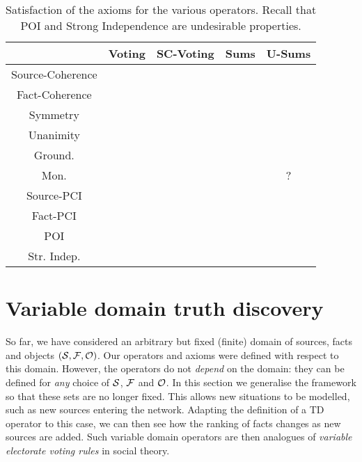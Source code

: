 \begin{table}
\newcommand{\yes}{\checkmark}
\newcommand{\no}{\sffamily{X}}
\newcommand{\notsure}{?}
\centering
    \caption{Satisfaction of the axioms for the various operators. Recall that
    POI and Strong Independence are undesirable properties.}
    \begin{tabular}{| c | c | c | c | c |}
        \hline
                         & Voting & SC-Voting  & Sums & U-Sums   \\
        \hline
        Source-Coherence & \no    & \yes       & \yes & \yes     \\
        Fact-Coherence   & \yes   & \no        & \yes & \yes     \\
        Symmetry         & \yes   & \yes       & \yes & \yes     \\
        Unanimity        & \yes   & \yes       & \yes & \yes     \\
        Ground.          & \yes   & \yes       & \yes & \yes     \\
        Mon.             & \yes   & \yes       & \no  & \notsure \\
        Source-PCI       & \yes   & \no        & \no  & \yes     \\
        Fact-PCI         & \yes   & \yes       & \no  & \yes     \\
        \hline
        POI              & \yes   & \yes       & \no  & \no      \\
        Str. Indep.      & \yes   & \yes       & \no  & \no      \\
        \hline
    \end{tabular}
\label{tab:axioms}
\end{table}

\section{Variable domain truth discovery}
\label{td_sec_variable_domain}

So far, we have considered an arbitrary but fixed (finite) domain of sources,
facts and objects $(\S, \F, \O)$. Our operators and axioms were defined with
respect to this domain. However, the operators do not \emph{depend} on the
domain: they can be defined for \emph{any} choice of $\S$, $\F$ and $\O$. In
this section we generalise the framework so that these sets are no longer
fixed. This allows new situations to be modelled, such as new sources entering
the network. Adapting the definition of a TD operator to this case, we can then
see how the ranking of facts changes as new sources are added. Such variable
domain operators are then analogues of \emph{variable electorate voting rules}
in social theory.

